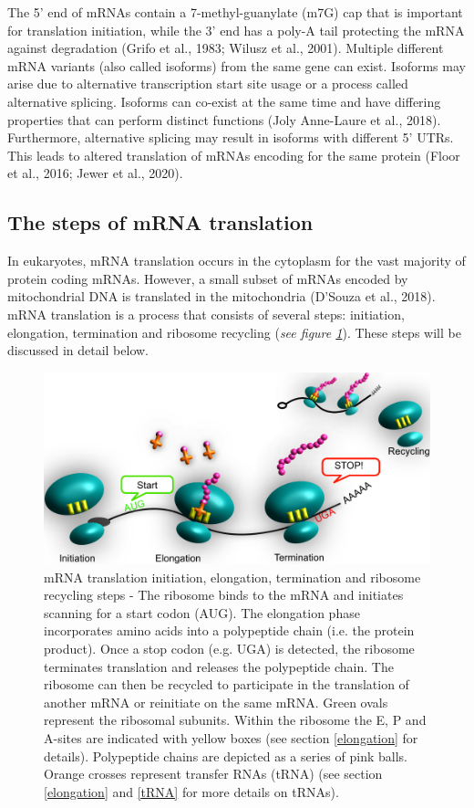 \documentclass[
  12pt,
  openany]{book}
\begin{document}
The 5' end of mRNAs contain a 7-methyl-guanylate (m7G) cap that is important for translation initiation, while the 3' end has a poly-A tail protecting the mRNA against degradation (Grifo et al., 1983; Wilusz et al., 2001). Multiple different mRNA variants (also called isoforms) from the same gene can exist. Isoforms may arise due to alternative transcription start site usage or a process called alternative splicing. Isoforms can co-exist at the same time and have differing properties that can perform distinct functions (Joly Anne-Laure et al., 2018). Furthermore, alternative splicing may result in isoforms with different 5' UTRs. This leads to altered translation of mRNAs encoding for the same protein (Floor et al., 2016; Jewer et al., 2020).

\subsection{The steps of mRNA translation} \label{translation}

In eukaryotes, mRNA translation occurs in the cytoplasm for the vast majority of protein coding mRNAs. However, a small subset of mRNAs encoded by mitochondrial DNA is translated in the mitochondria (D'Souza et al., 2018). mRNA translation is a process that consists of several steps: initiation, elongation, termination and ribosome recycling (\emph{see figure \ref{fig:doodlemRNASteps}}). These steps will be discussed in detail below.

\begin{figure}
  \includegraphics{./figures/doodleTranslation.pdf}
  \caption{mRNA translation initiation, elongation, termination and ribosome recycling steps - The ribosome binds to the mRNA and initiates scanning for a start codon (AUG). The elongation phase incorporates amino acids into a polypeptide chain (i.e. the protein product). Once a stop codon (e.g. UGA) is detected, the ribosome terminates translation and releases the polypeptide chain. The ribosome can then be recycled to participate in the translation of another mRNA or reinitiate on the same mRNA. Green ovals represent the ribosomal subunits. Within the ribosome the E, P and A-sites are indicated with yellow boxes (see section \ref{elongation} for details). Polypeptide chains are depicted as a series of pink balls. Orange crosses represent transfer RNAs (tRNA) (see section \ref{elongation} and \ref{tRNA} for more details on tRNAs).  \label{fig:doodlemRNASteps}}
\end{figure}
\clearpage
\end{document}
